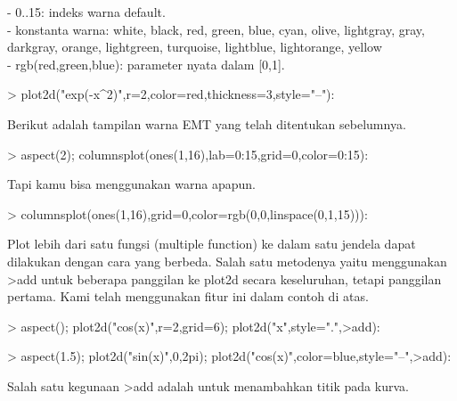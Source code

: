 \documentclass[a4paper,10pt]{article}
\begin{document}
\begin{eulernotebook}
\begin{eulercomment}
\begin{eulercomment}
\begin{eulercomment}
\begin{eulercomment}
\begin{eulercomment}
\begin{eulercomment}
\begin{eulercomment}
- 0..15: indeks warna default.\\
- konstanta warna: white, black, red, green, blue, cyan, olive,
lightgray, gray, darkgray, orange, lightgreen, turquoise, lightblue,
lightorange, yellow\\
- rgb(red,green,blue): parameter nyata dalam [0,1].
\end{eulercomment}
\begin{eulerprompt}
> plot2d("exp(-x^2)",r=2,color=red,thickness=3,style="--"):
\end{eulerprompt}
\begin{eulercomment}
Berikut adalah tampilan warna EMT yang telah ditentukan sebelumnya.
\end{eulercomment}
\begin{eulerprompt}
> aspect(2); columnsplot(ones(1,16),lab=0:15,grid=0,color=0:15):
\end{eulerprompt}
\begin{eulercomment}
Tapi kamu bisa menggunakan warna apapun.
\end{eulercomment}
\begin{eulerprompt}
> columnsplot(ones(1,16),grid=0,color=rgb(0,0,linspace(0,1,15))):
\end{eulerprompt}
\begin{eulercomment}
Plot lebih dari satu fungsi (multiple function) ke dalam satu jendela
dapat dilakukan dengan cara yang berbeda. Salah satu metodenya yaitu
menggunakan \textgreater{}add untuk beberapa panggilan ke plot2d secara
keseluruhan, tetapi panggilan pertama. Kami telah menggunakan fitur
ini dalam contoh di atas.
\end{eulercomment}
\begin{eulerprompt}
> aspect(); plot2d("cos(x)",r=2,grid=6); plot2d("x",style=".",>add):
\end{eulerprompt}
\begin{eulerprompt}
> aspect(1.5); plot2d("sin(x)",0,2pi); plot2d("cos(x)",color=blue,style="--",>add):
\end{eulerprompt}
\begin{eulercomment}
Salah satu kegunaan \textgreater{}add adalah untuk menambahkan titik pada kurva.

\end{eulercomment}
\end{eulercomment}
\end{eulercomment}
\end{eulercomment}
\end{eulercomment}
\end{eulercomment}
\end{eulercomment}
\end{eulernotebook}
\end{document}
